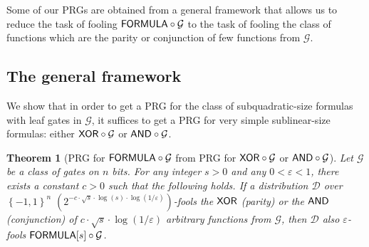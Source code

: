 \documentclass[10pt,a4paper]{article}
\newtheorem{theorem}{Theorem}
\newcommand{\boolpm}{\left\{-1,1\right\}}
\newcommand{\AND}{{\sf AND}}
\newcommand{\FORMULA}{{\sf FORMULA}}
\newcommand{\XOR}{{\sf XOR}}
\begin{document}
	Some of our PRGs are obtained from a general framework that allows us to reduce the task of fooling $\FORMULA\circ\mathcal{G}$ to the task of fooling the class of functions which are the parity or conjunction of few functions from $\mathcal{G}$.
	
	\subsection{The general framework}
	
	We show that in order to get a PRG for the class of subquadratic-size formulas with leaf gates in $\mathcal{G}$, it suffices to get a PRG for very simple sublinear-size formulas: either $\XOR\circ\mathcal{G}$ or $\AND\circ\mathcal{G}$.  
	
	\begin{theorem}[PRG for $\FORMULA\circ\mathcal{G}$ from PRG for $\XOR\circ\mathcal{G}$ or $\AND\circ\mathcal{G}$]\label{thm:prg-main}
		Let $\mathcal{G}$ be a class of gates on $n$ bits. For any integer $s>0$ and any $0<\varepsilon<1$, there exists a constant $c>0$ such that the following holds. If a distribution $\mathcal{D}$ over $\boolpm^n$ $\left(2^{-c\cdot\sqrt{s}\cdot\log (s)\cdot \log(1/\varepsilon)}\right)$-fools the $\XOR$ (parity) or the $\AND$ (conjunction) of $c\cdot\sqrt{s}\cdot \log(1/\varepsilon)$ arbitrary functions from $\mathcal{G}$, then $\mathcal{D}$ also $\varepsilon$-fools $\FORMULA[s]\circ\mathcal{G}$.
	\end{theorem}
	
\end{document}
